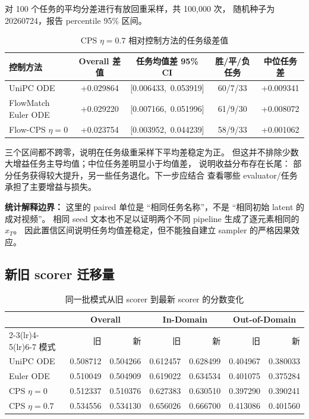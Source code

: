 \documentclass[11pt,a4paper]{article}
\newcommand{\warnbox}[1]{%
  \noindent\colorbox{WanLightOrange}{%
    \parbox{\dimexpr\textwidth-2\fboxsep\relax}{\textcolor{WanOrange}{#1}}%
  }%
}
\begin{document}
对 100 个任务的平均分差进行有放回重采样，共 100,000 次，
随机种子为 20260724，报告 percentile 95\% 区间。

\begin{table}[htbp]
  \centering
  \caption{CPS $\eta=0.7$ 相对控制方法的任务级差值}
  \label{tab:bootstrap}
  \small
  \begin{tabular}{lcccc}
    \toprule
    控制方法 & Overall 差值 & 任务均值差 95\% CI & 胜/平/负任务 & 中位任务差\\
    \midrule
    UniPC ODE
      & +0.029864 & [0.006433,\ 0.053919] & 60/7/33 & +0.009341\\
    FlowMatch Euler ODE
      & +0.029220 & [0.007166,\ 0.051996] & 61/9/30 & +0.008072\\
    Flow-CPS $\eta=0$
      & +0.023754 & [0.003952,\ 0.044239] & 58/9/33 & +0.001062\\
    \bottomrule
  \end{tabular}
\end{table}

三个区间都不跨零，说明在任务级重采样下平均差稳定为正。
但这并不排除少数大增益任务主导均值；中位任务差明显小于均值差，
说明收益分布存在长尾：
部分任务获得较大提升，另一些任务退化。下一步应结合
查看哪些 evaluator/任务承担了主要增益与损失。

\warnbox{\textbf{统计解释边界：}
这里的 paired 单位是 ``相同任务名称''，不是 ``相同初始 latent 的成对视频''。
相同 seed 文本也不足以证明两个不同 pipeline 生成了逐元素相同的 $x_T$。
因此置信区间说明任务均值差稳定，但不能独自建立 sampler 的严格因果效应。}

\subsection{新旧 scorer 迁移量}

\begin{table}[htbp]
  \centering
  \caption{同一批模式从旧 scorer 到最新 scorer 的分数变化}
  \label{tab:migration}
  \small
  \begin{tabular}{lrrrrrr}
    \toprule
    & \multicolumn{2}{c}{Overall}
    & \multicolumn{2}{c}{In-Domain}
    & \multicolumn{2}{c}{Out-of-Domain}\\
    \cmidrule(lr){2-3}\cmidrule(lr){4-5}\cmidrule(lr){6-7}
    模式 & 旧 & 新 & 旧 & 新 & 旧 & 新\\
    \midrule
    UniPC ODE
      & 0.508712 & 0.504266
      & 0.612457 & 0.628499
      & 0.404967 & 0.380033\\
    Euler ODE
      & 0.510049 & 0.504909
      & 0.619022 & 0.634534
      & 0.401075 & 0.375284\\
    CPS $\eta=0$
      & 0.512337 & 0.510376
      & 0.627383 & 0.630510
      & 0.397290 & 0.390241\\
    CPS $\eta=0.7$
      & 0.534556 & 0.534130
      & 0.656026 & 0.666700
      & 0.413086 & 0.401560\\
    \bottomrule
  \end{tabular}
\end{table}
\end{document}

